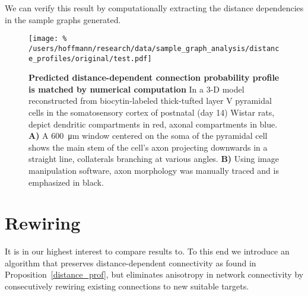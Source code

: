 We can verify this result by computationally extracting the distance
dependencies in the sample graphs generated. 

\begin{figure}[!htbp]
  \centering
  \texttt{[image: \%
    /users/hoffmann/research/data/sample\_graph\_analysis/distance\_profiles/original/test.pdf]} %
  \caption{\textbf{Predicted distance-dependent connection probability
    profile is matched by numerical computation} In a
    3-D model reconstructed from biocytin-labeled thick-tufted layer V
    pyramidal cells in the somatosensory cortex of postnatal (day 14)
    Wistar rats, \textcite{Romand2011} depict dendritic compartments in
    red, axonal compartments in blue.  \textbf{A)} A
    \SI{600}{\micro\meter} window centered on the soma of the pyramidal
    cell shows the main stem of the cell's axon projecting downwards in a
    straight line, collaterals branching at various angles. \textbf{B)}
    Using image manipulation software, axon morphology was manually traced
    and is emphasized in black.} %
  \label{fig:distance_theory_compare}%
\end{figure}






\section{Rewiring}


It is in our highest interest to compare results to. 
To this end we introduce an algorithm that preserves
distance-dependent connectivity as found in
Proposition~\ref{distance_prof}, but eliminates anisotropy in network
connectivity by consecutively rewiring existing connections to new
suitable targets.


